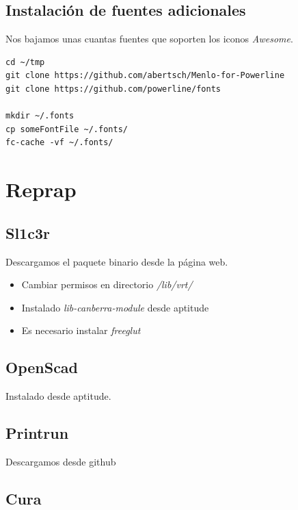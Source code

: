 \documentclass[12pt,spanish,]{article}
\providecommand{\tightlist}{%
  \setlength{\itemsep}{0pt}\setlength{\parskip}{0pt}}
\begin{document}
\subsection{Instalación de fuentes
adicionales}\label{instalaciuxf3n-de-fuentes-adicionales}

Nos bajamos unas cuantas fuentes que soporten los iconos \emph{Awesome}.

\begin{verbatim}
cd ~/tmp
git clone https://github.com/abertsch/Menlo-for-Powerline
git clone https://github.com/powerline/fonts

mkdir ~/.fonts
cp someFontFile ~/.fonts/
fc-cache -vf ~/.fonts/
\end{verbatim}

\section{Reprap}\label{reprap}

\subsection{Sl1c3r}\label{sl1c3r}

Descargamos el paquete binario desde la página web.

\begin{itemize}
\tightlist
\item
  Cambiar permisos en directorio \emph{/lib/vrt/}
\item
  Instalado \emph{lib-canberra-module} desde aptitude
\item
  Es necesario instalar \emph{freeglut}
\end{itemize}

\subsection{OpenScad}\label{openscad}

Instalado desde aptitude.

\subsection{Printrun}\label{printrun}

Descargamos desde github

\subsection{Cura}\label{cura}
\end{document}
